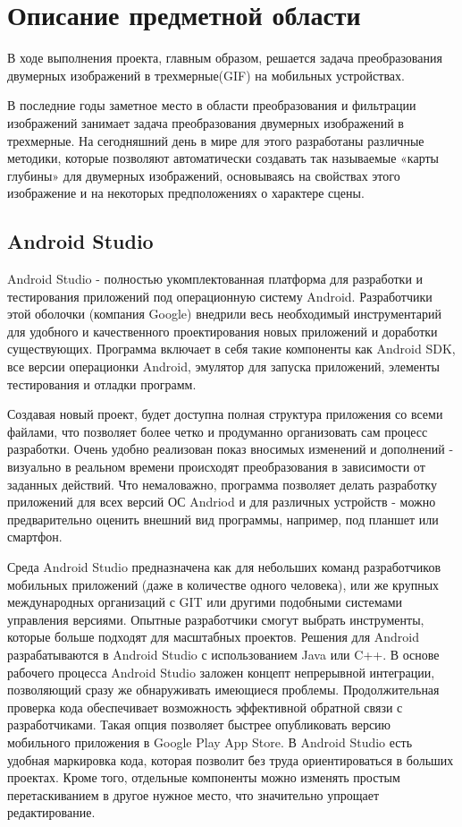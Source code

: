 
\section{Описание предметной области}
В ходе выполнения проекта, главным образом, решается задача преобразования двумерных изображений в трехмерные(GIF) на мобильных устройствах.

В последние годы заметное место в области преобразования и фильтрации изображений занимает задача преобразования двумерных изображений в трехмерные. На сегодняшний день в мире для этого разработаны различные методики, которые позволяют автоматически создавать так называемые «карты глубины» для двумерных изображений, основываясь на свойствах этого изображение и на некоторых предположениях о характере сцены. 

\subsection{Android Studio}
Android Studio - полностью укомплектованная платформа для разработки и тестирования приложений под операционную систему Android. Разработчики этой оболочки (компания Google) внедрили весь необходимый инструментарий для удобного и качественного проектирования новых приложений и доработки существующих. Программа включает в себя такие компоненты как Android SDK, все версии операционки Android, эмулятор для запуска приложений, элементы тестирования и отладки программ.

Создавая новый проект, будет доступна полная структура приложения со всеми файлами, что позволяет более четко и продуманно организовать сам процесс разработки. Очень удобно реализован показ вносимых изменений и дополнений - визуально в реальном времени происходят преобразования в зависимости от заданных действий. Что немаловажно, программа позволяет делать разработку приложений для всех версий ОС Andriod и для различных устройств - можно предварительно оценить внешний вид программы, например, под планшет или смартфон.

Среда Android Studio предназначена как для небольших команд разработчиков мобильных приложений (даже в количестве одного человека), или же крупных международных организаций с GIT или другими подобными системами управления версиями. Опытные разработчики смогут выбрать инструменты, которые больше подходят для масштабных проектов. Решения для Android разрабатываются в Android Studio с использованием Java или C++. В основе рабочего процесса Android Studio заложен концепт непрерывной интеграции, позволяющий сразу же обнаруживать имеющиеся проблемы. Продолжительная проверка кода обеспечивает возможность эффективной обратной связи с разработчиками. Такая опция позволяет быстрее опубликовать версию мобильного приложения в Google Play App Store. В Android Studio есть удобная маркировка кода, которая позволит без труда ориентироваться в больших проектах. Кроме того, отдельные компоненты можно изменять простым перетаскиванием в другое нужное место, что значительно упрощает редактирование.

